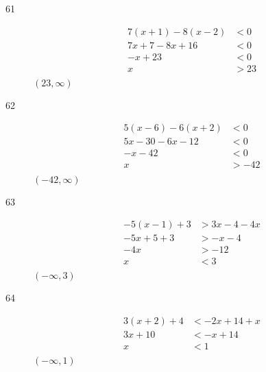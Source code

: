 \documentclass[letterpaper, landscape]{exam}
\begin{document}
\begin{description}

      \item[61]
        \begin{align*}
          7(x + 1) - 8(x - 2) & < 0 \\
          7x + 7 - 8x + 16    & < 0 \\
          -x + 23             & < 0 \\
          x                   & > 23 \\
        \end{align*}
        $\boxed{ (23, \infty) }$

      \item[62]
        \begin{align*}
          5(x - 6) -6(x + 2) & < 0 \\
          5x - 30 - 6x -12   & < 0 \\
          -x - 42            & < 0 \\
          x                  & > -42 \\
        \end{align*}
        $\boxed{ (-42, \infty) }$

      \item[63]
        \begin{align*}
          -5(x - 1) + 3 & > 3x - 4 -4x \\
          -5x + 5 + 3   & > -x - 4 \\
          -4x           & > -12 \\
          x             & < 3 \\
        \end{align*}
        $\boxed{ (-\infty, 3) }$

      \item[64]
        \begin{align*}
          3(x + 2) + 4 & < -2x + 14 + x \\
          3x + 10      & < -x + 14 \\
          x            & < 1 \\
        \end{align*}
        $\boxed{ (-\infty, 1) }$


\end{description}
\end{document}
